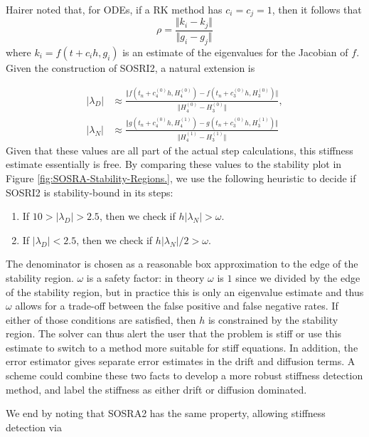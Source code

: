 \documentclass{article}
\begin{document}
Hairer noted that, for ODEs, if a RK method has $c_{i}=c_{j}=1$,
then it follows that
\begin{equation}
\rho=\frac{\Vert k_{i}-k_{j}\Vert}{\Vert g_{i}-g_{j}\Vert}\label{eq:rho}
\end{equation}
where $k_{i}=f(t+c_{i}h,g_{i})$ is an estimate of the eigenvalues
for the Jacobian of $f$. Given the construction of SOSRI2, a natural
extension is

\begin{align}
\left|\lambda_{D}\right|&\approx\frac{\Vert f\left(t_{n}+c_{4}^{(0)}h,H_{4}^{(0)}\right)-f\left(t_{n}+c_{3}^{(0)}h,H_{3}^{(0)}\right)\Vert}{\Vert H_{4}^{(0)}-H_{3}^{(0)}\Vert},\\
\left|\lambda_{N}\right|&\approx\frac{\Vert g\left(t_{n}+c_{4}^{(0)}h,H_{4}^{(1)}\right)-g\left(t_{n}+c_{3}^{(0)}h,H_{3}^{(1)}\right)\Vert}{\Vert H_{4}^{(1)}-H_{3}^{(1)}\Vert}\label{eq:sriopt2_eigen}
\end{align}
Given that these values are all part of the actual step calculations,
this stiffness estimate essentially is free. By comparing these values
to the stability plot in Figure \ref{fig:SOSRA-Stability-Regions.},
we use the following heuristic to decide if SOSRI2 is stability-bound
in its steps:
\begin{enumerate}
	\item If $10>\left|\lambda_{D}\right|>2.5$, then we check if $h\left|\lambda_{N}\right|>\omega$.
	\item If $\left|\lambda_{D}\right|<2.5$, then we check if $h\left|\lambda_{N}\right|/2>\omega$.
\end{enumerate}
The denominator is chosen as a reasonable box approximation to the
edge of the stability region. $\omega$ is a safety factor: in theory
$\omega$ is $1$ since we divided by the edge of the stability region,
but in practice this is only an eigenvalue estimate and thus $\omega$
allows for a trade-off between the false positive and false negative
rates. If either of those conditions are satisfied, then $h$ is constrained
by the stability region. The solver can thus alert the user that the
problem is stiff or use this estimate to switch to a method more suitable
for stiff equations. In addition, the error estimator gives separate
error estimates in the drift and diffusion terms. A scheme could combine
these two facts to develop a more robust stiffness detection method,
and label the stiffness as either drift or diffusion dominated.

We end by noting that SOSRA2 has the same property, allowing stiffness
detection via
\end{document}
